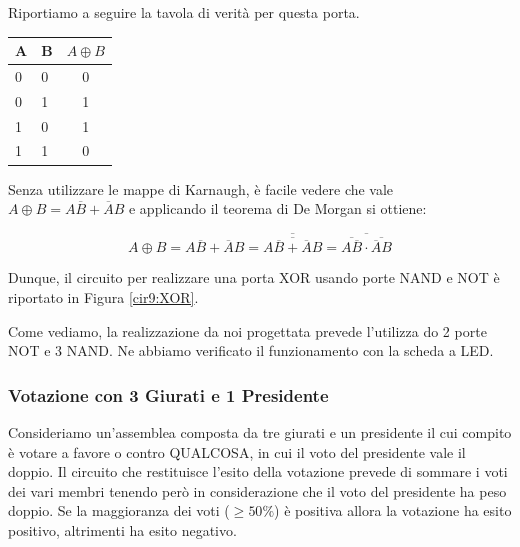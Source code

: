 Riportiamo a seguire la tavola di verità per questa porta.

\begin{table}[htpc]
\begin{minipage}{0.6\textwidth}
\centering
\begin{tabular}{|l|l|c|}
\hline
A & B & $A \oplus B$ \\
\hline
0 & 0 & 0\\
\hline
0 & 1 & 1\\
\hline
1 & 0 & 1\\
\hline
1 & 1 & 0\\
\hline
\end{tabular}
\label{tab9:XOR}
\end{minipage}
\end{table}

Senza utilizzare le mappe di Karnaugh, è facile vedere che vale $A \oplus B=A\overline B + \overline A B$ e applicando il teorema di De Morgan si ottiene:  %

$$A \oplus B=A\overline B + \overline A B=\overline{\overline{A\overline B + \overline A B}}=\overline{\overline{A\overline B} \cdot \overline{\overline A B}}$$

Dunque, il circuito per realizzare una porta XOR usando porte NAND e NOT è riportato in Figura \ref{cir9:XOR}.

Come vediamo, la realizzazione da noi progettata prevede l'utilizza do 2 porte NOT e 3 NAND.
Ne abbiamo verificato il funzionamento con la scheda a LED.

\newpage

\subsubsection{Votazione con 3 Giurati e 1 Presidente}
Consideriamo un'assemblea composta da tre giurati e un presidente il cui compito è votare a favore o contro QUALCOSA, in cui il voto del presidente vale il doppio.
Il circuito che restituisce l'esito della votazione prevede di sommare i voti dei vari membri tenendo però in considerazione che il voto del presidente ha peso doppio.
Se la maggioranza dei voti ($\geq 50\%$) è positiva allora la votazione ha esito positivo, altrimenti ha esito negativo.

